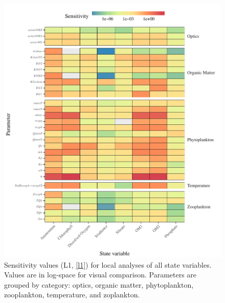 \documentclass[letterpaper,12pt,oneside]{article}\usepackage[]{graphicx}\usepackage[]{color}
\newcommand{\beginsupplement}{%
        \setcounter{table}{0}
        \renewcommand{\thetable}{S\arabic{table}}%
        \setcounter{figure}{0}
        \renewcommand{\thefigure}{S\arabic{figure}}%
     }
\begin{document}











\clearpage

\beginsupplement

\begin{figure}[!ht]

{\centering \includegraphics[width=\textwidth]{figs/sensalltile-1} 

}

\caption[Sensitivity values (L1, \cref{l1}) for local analyses of all state variables]{Sensitivity values (L1, \cref{l1}) for local analyses of all state variables.  Values are in log-space for visual comparison. Parameters are grouped by category: optics, organic matter, phytoplankton, zooplankton, temperature, and zoplankton.}\label{fig:sensalltile}
\end{figure}
\end{document}
